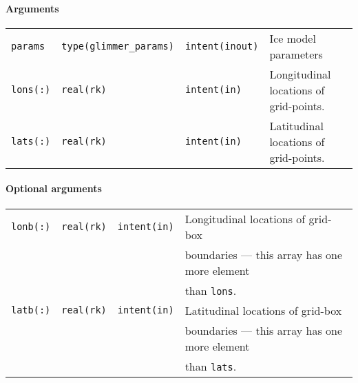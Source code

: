 \documentclass[11pt]{article}
\begin{document}
\paragraph{Arguments}
%
\begin{center}
\begin{tabular}{llll}
\texttt{params} & \texttt{type(glimmer\_params)} & \texttt{intent(inout)} &
Ice model parameters \\
\texttt{lons(:)} & \texttt{real(rk)} & \texttt{intent(in)} & Longitudinal
locations of grid-points.\\ 
\texttt{lats(:)} & \texttt{real(rk)} & \texttt{intent(in)} & Latitudinal
locations of grid-points.\\ 
\end{tabular}
\end{center}
%
\paragraph{Optional arguments}
%
\begin{center}
\begin{tabular}{llll}
\texttt{lonb(:)} & \texttt{real(rk)} & \texttt{intent(in)} & Longitudinal
locations of grid-box \\
 & & & boundaries --- this array has one more element \\
 & & & than \texttt{lons}. \\
\texttt{latb(:)} & \texttt{real(rk)} & \texttt{intent(in)} & Latitudinal
locations of grid-box \\
 & & & boundaries --- this array has one more element \\
 & & & than \texttt{lats}. \\
\end{tabular}
\end{center}
%
\end{document}
